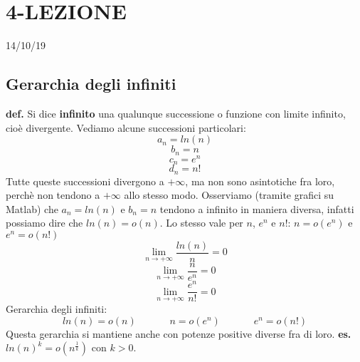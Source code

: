 \section*{4-LEZIONE}
14/10/19
\subsection*{Gerarchia degli infiniti}
\textbf{def.} Si dice \textbf{infinito} una qualunque successione o funzione con limite infinito, cioè divergente.
\newline
\newline
Vediamo alcune successioni particolari:
\[
    a_n = ln(n)
\]
\[
    b_n = n
\]
\[
    c_n = e^n
\]
\[
    d_n = n!
\]
Tutte queste successioni divergono a $+ \infty$, ma non sono asintotiche fra loro, perchè non tendono a $+ \infty$ allo stesso modo.
\newline
\newline
Osserviamo (tramite grafici su Matlab) che $a_n = ln(n)$ e $b_n = n$ tendono a infinito in maniera diversa, infatti possiamo dire che $ln(n) = o(n)$.
\newline
Lo stesso vale per $n$, $e^n$ e $n!$: $n = o(e^n)$ e $e^n = o(n!)$
\[
    \lim_{n\rightarrow +\infty} \frac{ln(n)}{n} = 0
\] 
\[
    \lim_{n\rightarrow +\infty} \frac{n}{e^n} = 0
\]
\[
    \lim_{n\rightarrow +\infty} \frac{e^n}{n!} = 0
\]
\newline
Gerarchia degli infiniti:
\[
    ln(n) = o(n) \;\;\;\;\;\;\;\;\;\;\;\; n=o(e^n) \;\;\;\;\;\;\;\;\;\;\;\; e^n = o(n!)
\]
Questa gerarchia si mantiene anche con potenze positive diverse fra di loro.
\newline
\textbf{es.} $ln(n)^k = o(n^\frac{1}{k})$ con $k>0$.
\newline
\newline
